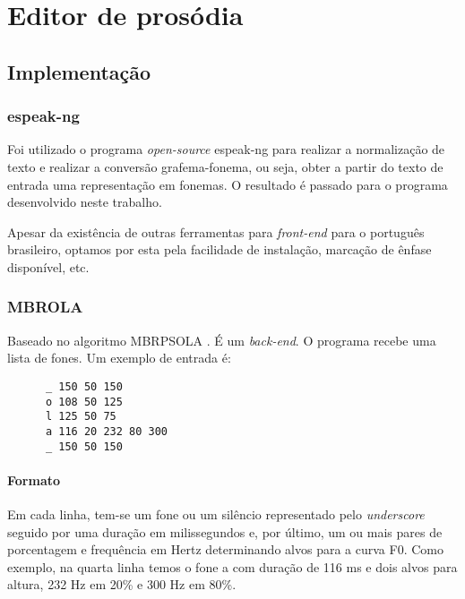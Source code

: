 
\simb[ms (milissegundos)]
\simb[Hz (Hertz)]
\chapter{Editor de prosódia}

\section{Implementação}

\subsection{espeak-ng}
Foi utilizado o programa \emph{open-source} espeak-ng \cite{espeakng} para realizar a normalização de texto e realizar a conversão grafema-fonema, ou seja, obter a partir do texto de entrada uma representação em fonemas. O resultado é passado para o programa desenvolvido neste trabalho.

Apesar da existência de outras ferramentas para \emph{front-end} para o português brasileiro, optamos por esta pela facilidade de instalação, marcação de ênfase disponível, etc.

\subsection{MBROLA}
Baseado no algoritmo {MBRPSOLA} \cite{mbrpsola}. É um \emph{back-end}. O programa recebe uma lista de fones. Um exemplo de entrada é:

\begin{lstlisting}
      _ 150 50 150
      o 108 50 125
      l 125 50 75
      a 116 20 232 80 300
      _ 150 50 150
\end{lstlisting}

\subsubsection{Formato}
Em cada linha, tem-se um fone ou um silêncio representado pelo \emph{underscore} seguido por uma duração em milissegundos e, por último, um ou mais pares de porcentagem e frequência em Hertz determinando alvos para a curva F0. Como exemplo, na quarta linha temos o fone \/a\/ com duração de 116 ms e dois alvos para altura, 232 Hz em 20\% e 300 Hz em 80\%.

